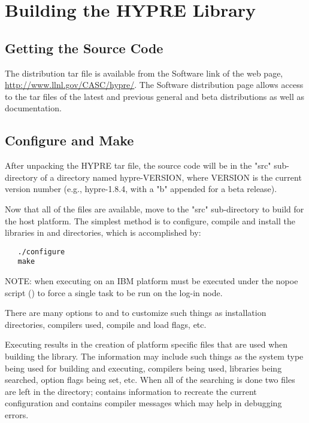 
\chapter{Building the HYPRE Library}


\section{Getting the Source Code}

The \hypre{} distribution tar file is available from the Software link of the
\hypre{} web page, \url{http://www.llnl.gov/CASC/hypre/}.  The \hypre{}
Software distribution page allows access to the tar files of the latest and
previous general and beta distributions as well as documentation.


\section{Configure and Make}

After unpacking the HYPRE tar file, the source code will be in the "src" 
sub-directory of a directory named hypre-VERSION, where VERSION is the current 
version number (e.g., hypre-1.8.4, with a "b" appended for a beta release).

Now that all of the files are available, move to the "src" sub-directory to build
\hypre{} for the host platform.  The simplest method is to configure, compile and
install the libraries in  and  directories,
which is accomplished by:
\begin{verbatim}
   ./configure
   make
\end{verbatim}

NOTE: when executing on an IBM platform  must be executed under 
the nopoe script () to force a single 
task to be run on the log-in node.

There are many options to  and  to customize such 
things as installation directories, compilers used, compile and load flags, etc.

Executing  results in the creation of platform specific files 
that are used when building the library. The information may include such things
as the system type being used for building and executing, compilers being used, 
libraries being searched, option flags being set, etc.  When all of the searching
is done two files are left in the  directory;  
contains information to recreate the current configuration and 
contains compiler messages which may help in debugging  errors. 

